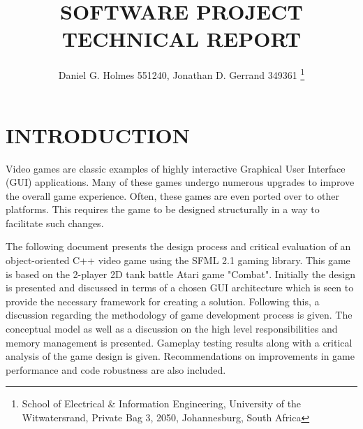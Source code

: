\documentclass[10pt,twocolumn]{witseiepaper}
\begin{document}
\title{SOFTWARE PROJECT TECHNICAL REPORT}

\author{Daniel G. Holmes 551240, Jonathan D. Gerrand 349361
\thanks{School of Electrical \& Information Engineering, University of the
Witwatersrand, Private Bag 3, 2050, Johannesburg, South Africa}
}

% 



\maketitle
\thispagestyle{empty}\pagestyle{empty}


%
\section{INTRODUCTION}%
Video games are classic examples of highly interactive Graphical User Interface (GUI) applications. Many of these games undergo numerous upgrades to improve the overall game experience. Often, these games are even ported over to other platforms. This requires the game to be designed structurally in a way to facilitate such changes. 

The following document presents the design process and critical evaluation of an object-oriented C++ video game using the SFML 2.1 gaming library. This game is based on the 2-player 2D tank battle Atari game "Combat". Initially the design is presented and discussed in terms of a chosen GUI architecture which is seen to provide the necessary framework for creating a solution. Following this, a discussion regarding the methodology of game development process is given. The conceptual model as well as a discussion on the high level responsibilities and memory management is presented. Gameplay testing results along with a critical analysis of the game design is given. Recommendations on improvements in game performance and code robustness are also included.
\end{document}
